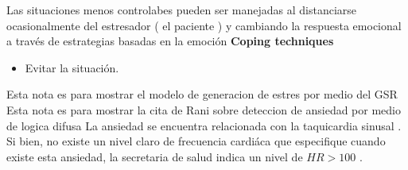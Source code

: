 \documentclass[letterpaper,12pt]{cicese}
\begin{document}
	Las situaciones menos controlabes pueden ser manejadas al distanciarse ocasionalmente del estresador ( el paciente )  y cambiando la respuesta emocional a trav\'es de estrategias basadas en la emoci\'on
	\textbf{Coping techniques}

	\citep{li20121}
	\begin{itemize}
		\item Evitar la situaci\'on.
	\end{itemize}

	Esta nota es para mostrar el modelo de generacion de estres por medio del GSR \citep{Bakker2011}
	Esta nota es para mostrar la cita de Rani sobre deteccion de ansiedad por medio de logica difusa\citep{Rani2007323}
	La ansiedad se encuentra relacionada con la taquicardia sinusal \citep{EcgPractica}. Si bien, no existe un nivel claro de frecuencia cardi\'aca que especifique cuando existe esta ansiedad, la secretaria de salud indica un nivel de $HR > 100$ \citep{GPCSecSalud}.
        {\normalsize
                
        }

	
\end{document}
